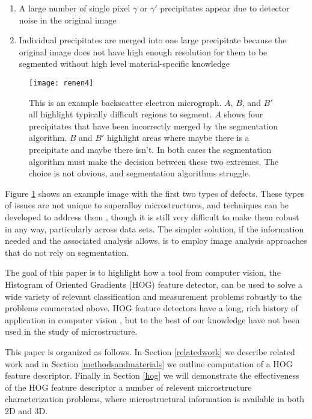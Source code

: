 \documentclass[review]{elsarticle}
\begin{document}
		\begin{enumerate}
			\item \label{prob1} A large number of single pixel $\gamma$ or $\gamma'$ precipitates appear due to detector noise in the original image
			\item Individual precipitates are merged into one large precipitate because the original image does not have high enough resolution for them to be segmented without high level material-specific knowledge
		\end{enumerate}
	
		\begin{figure}[!ht]
	  		\centering
			\texttt{[image: renen4]}
	  		\caption{ This is an example backscatter electron micrograph. $A$, $B$, and $B'$ all highlight typically difficult regions to segment. $A$ shows four precipitates that have been incorrectly merged by the segmentation algorithm. $B$ and $B'$ highlight areas where maybe there is a precipitate and maybe there isn't. In both cases the segmentation algorithm must make the decision between these two extremes. The choice is not obvious, and segmentation algorithms struggle. }
	  		\label{figure1}
		\end{figure}

		Figure \ref{figure1} shows an example image with the first two types of defects. These types of issues are not unique to superalloy microstructures, and techniques can be developed to address them \cite{comer, marc1, marc2, marc3}, though it is still very difficult to make them robust in any way, particularly across data sets. The simpler solution, if the information needed and the associated analysis allows, is to employ image analysis approaches that do not rely on segmentation.
	

		The goal of this paper is to highlight how a tool from computer vision, the Histogram of Oriented Gradients (HOG) feature detector, can be used to solve a wide variety of relevant classification and measurement problems robustly to the problems enumerated above. HOG feature detectors have a long, rich history of application in computer vision \cite{gradtex, hog, girsh}, but to the best of our knowledge have not been used in the study of microstructure.

		This paper is organized as follows. In Section \ref{relatedwork} we describe related work and in Section \ref{methodsandmaterials} we outline computation of a HOG feature descriptor. Finally in Section \ref{hog} we will demonstrate the effectiveness of the HOG feature descriptor a number of relevent microstructure characterization problems, where microstructural information is available in both 2D and 3D.
	
\end{document}
